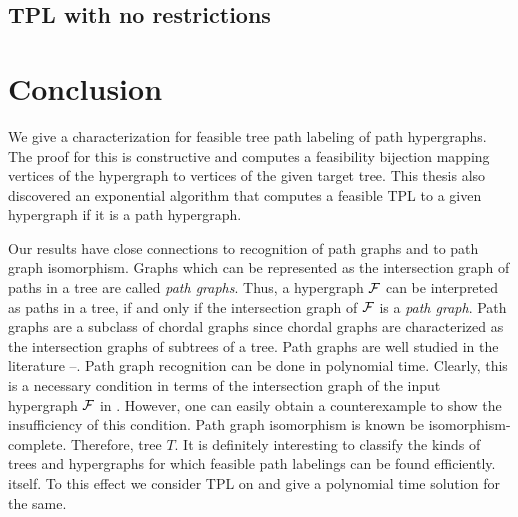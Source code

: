 \documentclass[MS]             %
              {iitmdiss_as}    %
\begin{document}
\section{ TPL with no restrictions}
\label{sec:norestraint}


\chapter{Conclusion}
\label{sec:conclusion}

We give a characterization for feasible tree path labeling of path
hypergraphs. The proof for this is constructive and computes a
feasibility bijection mapping vertices of the hypergraph to vertices
of the given target tree. This thesis also discovered an exponential algorithm
that computes a feasible TPL to a given hypergraph if it is a path hypergraph.

Our results have close connections to recognition of path graphs and
to path graph isomorphism.  Graphs which can be represented as the
intersection graph of paths in a tree are called {\em path
  graphs}\cite{mcg04}. Thus, a hypergraph ${\cal F}$ can be interpreted as
paths in a tree, if and only if the intersection graph of ${\cal F}$ is a
{\em path graph}. Path graphs are a subclass of chordal graphs since
chordal graphs are characterized as the intersection graphs of
subtrees of a tree\cite{mcg04}.  Path graphs are well studied in the
literature \cite{plr70}--\cite{mcg04}.  Path graph recognition can be done in
polynomial time\cite{gav78,aas93}.  Clearly, this is a necessary
condition in terms of the intersection graph of the input hypergraph
${\cal F}$ in \FTPL. However, one can easily obtain a counterexample to
show the insufficiency of this condition.  Path graph isomorphism is known be
isomorphism-complete\cite{kklv10}. Therefore,  tree $T$.  It is
  definitely interesting to classify the kinds of trees and
  hypergraphs for which feasible path labelings can be
found efficiently.   itself.
 To this effect we consider TPL on {\kstar} and give a polynomial time
 solution for the same. 
\end{document}
